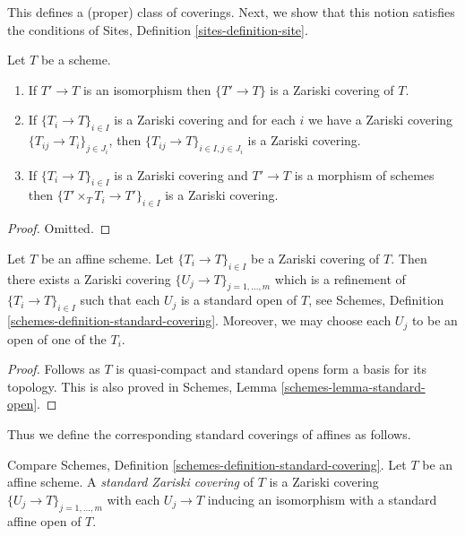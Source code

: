 \noindent
This defines a (proper) class of coverings.
Next, we show that this notion satisfies the conditions of
Sites, Definition \ref{sites-definition-site}.

\begin{lemma}
\label{lemma-zariski}
Let $T$ be a scheme.
\begin{enumerate}
\item If $T' \to T$ is an isomorphism then $\{T' \to T\}$
is a Zariski covering of $T$.
\item If $\{T_i \to T\}_{i\in I}$ is a Zariski covering and for each
$i$ we have a Zariski covering $\{T_{ij} \to T_i\}_{j\in J_i}$, then
$\{T_{ij} \to T\}_{i \in I, j\in J_i}$ is a Zariski covering.
\item If $\{T_i \to T\}_{i\in I}$ is a Zariski covering
and $T' \to T$ is a morphism of schemes then
$\{T' \times_T T_i \to T'\}_{i\in I}$ is a Zariski covering.
\end{enumerate}
\end{lemma}

\begin{proof}
Omitted.
\end{proof}

\begin{lemma}
\label{lemma-zariski-affine}
Let $T$ be an affine scheme. Let $\{T_i \to T\}_{i \in I}$ be a
Zariski covering of $T$. Then there exists a Zariski covering
$\{U_j \to T\}_{j = 1, \ldots, m}$ which is a refinement
of $\{T_i \to T\}_{i \in I}$ such that each $U_j$ is a standard
open of $T$, see
Schemes, Definition \ref{schemes-definition-standard-covering}.
Moreover, we may choose each $U_j$ to be an open of one of the $T_i$.
\end{lemma}

\begin{proof}
Follows as $T$ is quasi-compact and standard opens form a basis
for its topology. This is also proved in
Schemes, Lemma \ref{schemes-lemma-standard-open}.
\end{proof}

\noindent
Thus we define the corresponding standard coverings of affines as follows.

\begin{definition}
\label{definition-standard-Zariski}
Compare Schemes, Definition \ref{schemes-definition-standard-covering}.
Let $T$ be an affine scheme. A {\it standard Zariski covering}
of $T$ is a Zariski covering $\{U_j \to T\}_{j = 1, \ldots, m}$
with each $U_j \to T$ inducing an isomorphism with a standard affine open
of $T$.
\end{definition}

